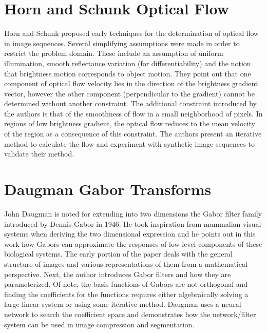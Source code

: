 \documentclass[letterpaper]{article}
\date{\today}
\begin{document}
\maketitle

\section{Horn and Schunk Optical Flow}
Horn and Schunk\cite{Horn-flow} proposed early techniques for the determination of optical flow in image sequences. Several simplifying assumptions were made in order to restrict the problem domain.  These include an assumption of uniform illumination, smooth reflectance variation (for differentiability) and the notion that brightness motion corresponds to object motion.  They point out that one component of optical flow velocity lies in the direction of the brightness gradient vector, however the other component (perpendicular to the gradient) cannot be determined without another constraint.  The additional constraint introduced by the authors is that of the smoothness of flow in a small neighborhood of pixels. In regions of low brightness gradient, the optical flow reduces to the mean velocity of the region as a consequence of this constraint.  The authors present an iterative method to calculate the flow and experiment with synthetic image sequences to validate their method.

\section{Daugman Gabor Transforms}
John Daugman is noted for extending into two dimensions the Gabor filter family introduced by Dennis Gabor in 1946.  He took inspiration from mammalian visual systems when deriving the two dimensional expression and he points out in this work how Gabors can approximate the responses of low level components of these biological systems.  The early portion of the paper deals with the general structure of images and various representations of them from a mathematical perspective.  Next, the author introduces Gabor filters and how they are parameterized.  Of note, the basis functions of Gabors are not orthogonal and finding the coefficients for the functions requires either algebraically solving a large linear system or using some iterative method.  Daugman uses a neural network to search the coefficient space and demonstrates how the network/filter system can be used in image compression and segmentation\cite{daugman}.



\end{document}
